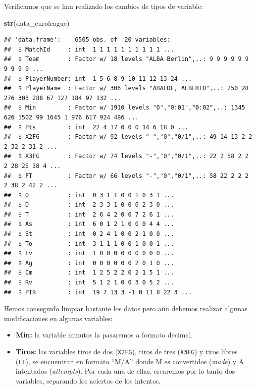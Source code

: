 \documentclass[
]{article}
\newenvironment{Shaded}{\begin{snugshade}}{\end{snugshade}}
\newcommand{\KeywordTok}[1]{\textcolor[rgb]{0.13,0.29,0.53}{\textbf{#1}}}
\newcommand{\NormalTok}[1]{#1}
\providecommand{\tightlist}{%
  \setlength{\itemsep}{0pt}\setlength{\parskip}{0pt}}
\begin{document}
Verificamos que se han realizado los cambios de tipos de variable:

\begin{Shaded}
\begin{Highlighting}[]
\KeywordTok{str}\NormalTok{(data_euroleague)}
\end{Highlighting}
\end{Shaded}

\begin{verbatim}
## 'data.frame':    6505 obs. of  20 variables:
##  $ MatchId     : int  1 1 1 1 1 1 1 1 1 1 ...
##  $ Team        : Factor w/ 18 levels "ALBA Berlin",..: 9 9 9 9 9 9 9 9 9 9 ...
##  $ PlayerNumber: int  1 5 6 8 9 10 11 12 13 24 ...
##  $ PlayerName  : Factor w/ 306 levels "ABALDE, ALBERTO",..: 250 28 276 303 288 67 127 184 97 132 ...
##  $ Min         : Factor w/ 1910 levels "0","0:01","0:02",..: 1345 626 1502 99 1645 1 976 617 924 486 ...
##  $ Pts         : int  22 4 17 0 0 0 14 6 18 0 ...
##  $ X2FG        : Factor w/ 92 levels "-","0","0/1",..: 49 14 13 2 2 2 32 2 31 2 ...
##  $ X3FG        : Factor w/ 74 levels "-","0","0/1",..: 22 2 58 2 2 2 28 25 38 4 ...
##  $ FT          : Factor w/ 66 levels "-","0","0/1",..: 58 22 2 2 2 2 38 2 42 2 ...
##  $ O           : int  0 3 1 1 0 0 1 0 3 1 ...
##  $ D           : int  2 3 3 1 0 0 6 2 3 0 ...
##  $ T           : int  2 6 4 2 0 0 7 2 6 1 ...
##  $ As          : int  6 0 1 2 1 0 0 0 4 4 ...
##  $ St          : int  0 2 4 1 0 0 2 1 0 0 ...
##  $ To          : int  3 1 1 1 0 0 1 0 0 1 ...
##  $ Fv          : int  1 0 0 0 0 0 0 0 0 0 ...
##  $ Ag          : int  0 0 0 0 0 0 2 0 1 0 ...
##  $ Cm          : int  1 2 5 2 2 0 2 1 5 1 ...
##  $ Rv          : int  5 1 2 1 0 0 3 0 5 2 ...
##  $ PIR         : int  19 7 13 3 -1 0 11 8 22 3 ...
\end{verbatim}

\newpage

Hemos conseguido limpiar bastante los datos pero aún debemos realizar
algunas modificaciones en algunas variables:

\begin{itemize}
\tightlist
\item
  \textbf{Min:} la variable minutos la pasaremos a formato decimal.
\item
  \textbf{Tiros:} las variables tiros de dos (\texttt{X2FG}), tiros de
  tres (\texttt{X3FG}) y tiros libres (\texttt{FT}), se encuentran en
  formato ``M/A'' donde M es convertidos (\emph{made}) y A intentados
  (\emph{attempts}). Por cada una de ellas, crearemos por lo tanto dos
  variables, separando los aciertos de los intentos.
\end{itemize}
\end{document}
